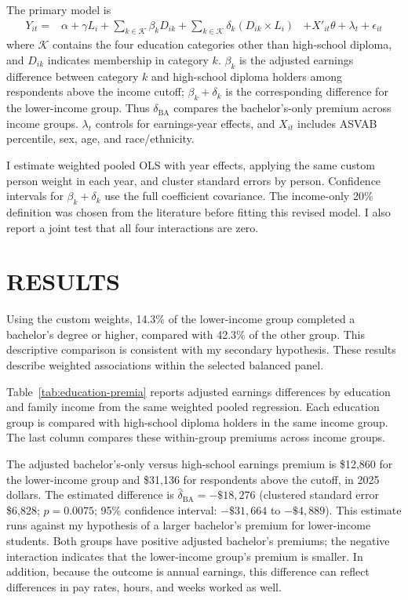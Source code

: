 \documentclass[12pt,letterpaper]{article}
\begin{document}
The primary model is
\[
\begin{aligned}
    Y_{it}={}&\alpha+\gamma L_i+\sum_{k\in\mathcal K}\beta_k D_{ik}
              +\sum_{k\in\mathcal K}\delta_k(D_{ik}\times L_i)
             &+X'_{it}\theta+\lambda_t+\epsilon_{it}
\end{aligned}
\]
where $\mathcal K$ contains the four education categories other than high-school
diploma, and $D_{ik}$ indicates membership in category $k$. $\beta_k$ is the adjusted
earnings difference between category $k$ and high-school diploma holders among
respondents above the income cutoff; $\beta_k+\delta_k$ is the corresponding
difference for the lower-income group. Thus $\delta_{\mathrm{BA}}$ compares the
bachelor's-only premium across income groups. $\lambda_t$ controls for earnings-year
effects, and $X_{it}$ includes ASVAB percentile, sex, age, and race/ethnicity.\newline

I estimate weighted pooled OLS with year effects, applying the same custom person
weight in each year, and cluster standard errors by person. Confidence intervals
for $\beta_k+\delta_k$ use the full coefficient covariance. The income-only 20\% 
definition was chosen from the literature before fitting this revised model. I also 
report a joint test that all four interactions are zero. \newline

\section*{RESULTS}
Using the custom weights, 14.3\% of the lower-income group completed a bachelor's
degree or higher, compared with 42.3\% of the other group. This descriptive comparison
is consistent with my secondary hypothesis. These results describe weighted
associations within the selected balanced panel.\newline

Table~\ref{tab:education-premia} reports adjusted earnings differences by education
and family income from the same weighted pooled regression. Each education group
is compared with high-school diploma holders in the same income group. The last
column compares these within-group premiums across income groups.\newline


The adjusted bachelor's-only versus high-school earnings premium is \$12,860 for
the lower-income group and \$31,136 for respondents above the cutoff, in 2025 dollars.
The estimated difference is $\hat\delta_{\mathrm{BA}}=-\$18,276$
(clustered standard error \$6,828; $p=0.0075$; 95\% confidence interval:
$-\$31,664$ to $-\$4,889$). This estimate runs against my hypothesis of a larger
bachelor's premium for lower-income students. Both groups have positive adjusted
bachelor's premiums; the negative interaction indicates that the lower-income
group's premium is smaller. In addition, because the outcome is annual earnings, 
this difference can reflect differences in pay rates, hours, and weeks worked as well.\newline
\end{document}
